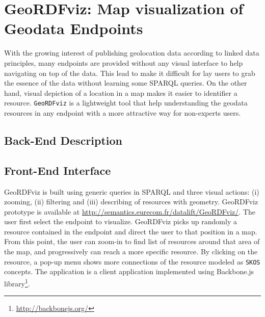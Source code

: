 \section{GeoRDFviz: Map visualization of Geodata Endpoints}
\label{sec:geordfviz}

With the growing interest of publishing geolocation data according to linked data principles, many endpoints are provided without any visual interface to help navigating on top of the data. This lead to make it difficult for lay users to grab the essence of the data without learning some SPARQL queries. On the other hand, visual depiction of a location in a map makes it easier to identifier a resource. \texttt{GeoRDFviz} is a lightweight tool that help understanding the geodata resources in any endpoint with a more attractive way for non-experts users. 

\subsection{Back-End Description}


\subsection{Front-End Interface}

GeoRDFviz is built using generic queries in SPARQL and three visual actions: (i) zooming, (ii) filtering and (iii) describing of resources with geometry. GeoRDFviz prototype is available at \url{http://semantics.eurecom.fr/datalift/GeoRDFviz/}.
The user first select the endpoint to visualize. GeoRDFviz picks up randomly a resource contained in the endpoint and direct the user to that position in a map. From this point, the user can zoom-in to find list of resources around that area of the map, and progressively can reach a more specific resource. By clicking on the resource, a pop-up menu shows more connections of the resource modeled as \texttt{SKOS} concepts. The application is a client application implemented using Backbone.js library\footnote{\url{http://backbonejs.org/}}.

